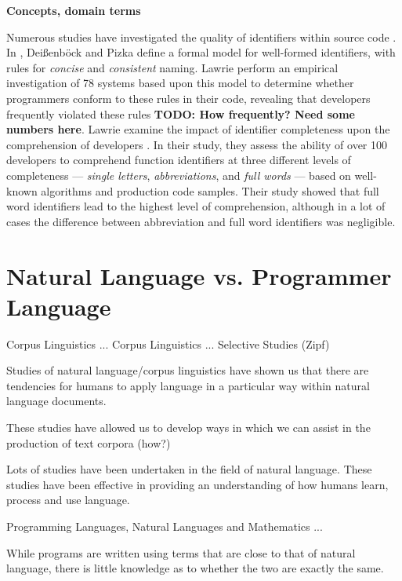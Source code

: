 \textbf{Concepts, domain terms}

Numerous studies have investigated the quality of identifiers within source code \cite{Abebe09b,Caprile00a,Caprile99a,Deissenboeck06a,Lawrie06a,Lawrie06b,Lawrie07a,Takang96a}. In \cite{Deissenboeck06a}, Dei{\ss}enb\"{o}ck and Pizka define a formal model for well-formed identifiers, with rules for \emph{concise} and \emph{consistent} naming. Lawrie \etal perform an empirical investigation of 78 systems based upon this model to determine whether programmers conform to these rules in their code, revealing that developers frequently violated these rules \textbf{TODO: How frequently? Need some numbers here}. Lawrie \etal examine the impact of identifier completeness upon the comprehension of developers \cite{Lawrie06a}. In their study, they assess the ability of over 100 developers to comprehend function identifiers at three different levels of completeness --- \emph{single letters}, \emph{abbreviations}, and \emph{full words} --- based on well-known algorithms and production code samples. Their study showed that full word identifiers lead to the highest level of comprehension, although in a lot of cases the difference between abbreviation and full word identifiers was negligible.


\section{Natural Language vs. Programmer Language} %
\label{sec:natural_language_vs_programmer_language}

Corpus Linguistics ... \cite{Biber98a} 
Corpus Linguistics ... \cite{McEnery01a}
Selective Studies (Zipf) \cite{Zipf49a}

Studies of natural language/corpus linguistics have shown us that there are tendencies for humans to apply language in a particular way within natural language documents.

These studies have allowed us to develop ways in which we can assist in the production of text corpora (how?)

Lots of studies have been undertaken in the field of natural language. These studies have been effective in providing an understanding of how humans learn, process and use language.

Programming Languages, Natural Languages and Mathematics ... \cite{Naur75a}

While programs are written using terms that are close to that of natural language, there is little knowledge as to whether the two are exactly the same.

